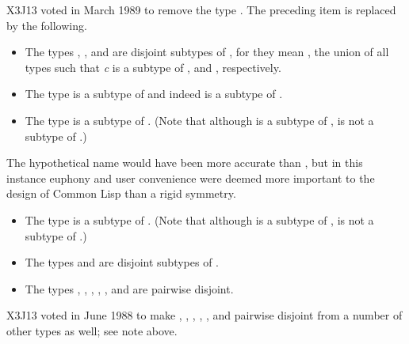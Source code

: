 {\begin{newer}
X3J13 voted in March 1989  to remove the type .
The preceding item is replaced by the following.
\begin{itemize}
\item
The types , , and
 are disjoint subtypes of , for they
mean , the union of all types
 such that {\it c} is a subtype of ,
and , respectively.
\end{itemize}
\end{newer}

\begin{itemize}
\item
The type  is a subtype of  and indeed
is a subtype of .

\item
The type  is a subtype of .
(Note that although  is a subtype of ,
 is not a subtype of .)
\end{itemize}

\beforenoterule
\begin{rationale}
The hypothetical name  would have been more accurate than
, but in this instance euphony and
user convenience were deemed more important to the design
of Common Lisp than a rigid symmetry.
\end{rationale}
\afternoterule

\begin{itemize}
\item
The type  is a subtype of .
(Note that although  is a subtype of ,
 is not a subtype of .)

\item
The types  and  are disjoint subtypes of .

\item
The types , , , ,
, and  are pairwise disjoint.
\end{itemize}

\begin{new}
X3J13 voted in June 1988
to make , , , ,
, and 
pairwise disjoint from a number of other types as well;
see note above.
\end{new}

}
